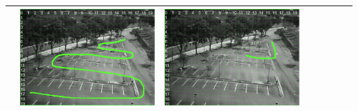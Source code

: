 \begin{landscape}
\begin{table}[]
{\begin{tabular}{|l||l|l|l|l|l|l|l|}
 & \includegraphics[scale=0.25]{image/suppResults/q6.PNG}
 & \includegraphics[scale=0.25]{image/suppResults/q7.PNG} \\ \hline

\end{tabular}}
\end{table}
\end{landscape}
